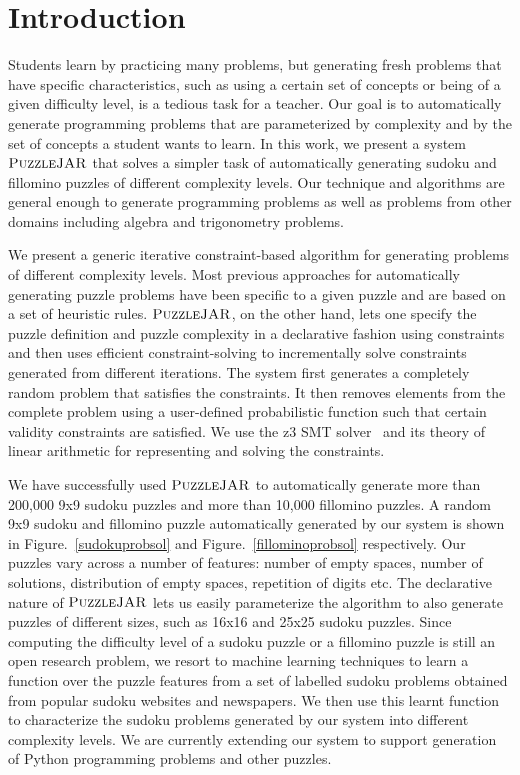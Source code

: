 \section{Introduction}

Students learn by practicing many problems, but generating fresh
problems that have specific characteristics, such as using a certain
set of concepts or being of a given difficulty level, is a tedious
task for a teacher. Our goal is to automatically generate programming
problems that are parameterized by complexity and by the set of
concepts a student wants to learn. In this work, we present a system
$\textsc{PuzzleJAR}$ that solves a simpler task of automatically generating
sudoku and fillomino puzzles of different complexity levels. Our
technique and algorithms are general enough to generate programming
problems as well as problems from other domains including algebra and
trigonometry problems.

We present a generic iterative constraint-based algorithm for
generating problems of different complexity levels. Most previous
approaches for automatically generating puzzle problems have been
specific to a given puzzle and are based on a set of heuristic
rules. $\textsc{PuzzleJAR}$, on the other hand, lets one specify the puzzle
definition and puzzle complexity in a declarative fashion using
constraints and then uses efficient constraint-solving to
incrementally solve constraints generated from different
iterations. The system first generates a completely random problem
that satisfies the constraints. It then removes elements from the
complete problem using a user-defined probabilistic function such that
certain validity constraints are satisfied. We use the z3 SMT
solver~\cite{z3} and its theory of linear arithmetic for representing
and solving the constraints.

We have successfully used $\textsc{PuzzleJAR}$ to automatically generate more
than 200,000 9x9 sudoku puzzles and more than 10,000 fillomino
puzzles. A random 9x9 sudoku and fillomino puzzle automatically
generated by our system is shown in Figure.~\ref{sudokuprobsol} and
Figure.~\ref{fillominoprobsol} respectively. Our puzzles vary across a
number of features: number of empty spaces, number of solutions,
distribution of empty spaces, repetition of digits etc. The
declarative nature of $\textsc{PuzzleJAR}$ lets us easily parameterize the
algorithm to also generate puzzles of different sizes, such as 16x16
and 25x25 sudoku puzzles. Since computing the difficulty level of a
sudoku puzzle or a fillomino puzzle is still an open research problem,
we resort to machine learning techniques to learn a function over the
puzzle features from a set of labelled sudoku problems obtained from
popular sudoku websites and newspapers. We then use this learnt
function to characterize the sudoku problems generated by our system
into different complexity levels. We are currently extending our
system to support generation of Python programming problems and other
puzzles.

